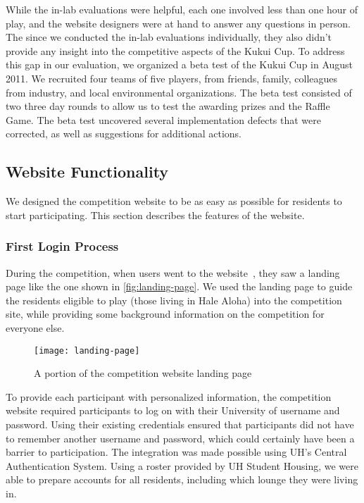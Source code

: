 While the in-lab evaluations were helpful, each one involved less than one hour of play, and the website designers were at hand to answer any questions in person. The since we conducted the in-lab evaluations individually, they also didn't provide any insight into the competitive aspects of the Kukui Cup. To address this gap in our evaluation, we organized a beta test of the Kukui Cup in August 2011. We recruited four teams of five players, from friends, family, colleagues from industry, and local environmental organizations. The beta test consisted of two three day rounds to allow us to test the awarding prizes and the Raffle Game. The beta test uncovered several implementation defects that were corrected, as well as suggestions for additional actions.


\subsection{Website Functionality}

We designed the competition website to be as easy as possible for residents to start participating. This section describes the features of the website.


\subsubsection{First Login Process}

During the competition, when users went to the website~\cite{kukuicup-website}, they saw a landing page like the one shown in \autoref{fig:landing-page}. We used the landing page to guide the residents eligible to play (those living in Hale Aloha) into the competition site, while providing some background information on the competition for everyone else.

\begin{figure}[htbp]
	\centering
		\texttt{[image: landing-page]}
		\caption{A portion of the competition website landing page}
\label{fig:landing-page}
\end{figure}

To provide each participant with personalized information, the competition website required participants to log on with their University of \Hawaii username and password. Using their existing credentials ensured that participants did not have to remember another username and password, which could certainly have been a barrier to participation. The integration was made possible using UH's Central Authentication System. Using a roster provided by UH Student Housing, we were able to prepare accounts for all residents, including which lounge they were living in.

